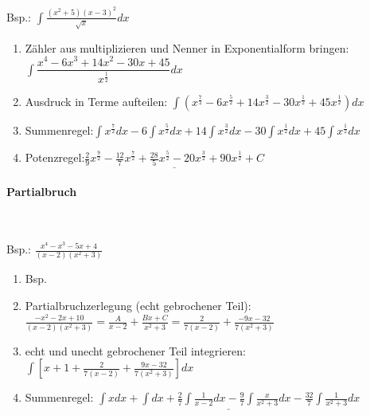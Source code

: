 				\begin{minipage}[c]{.2\textwidth}
					Bsp.: $\int \frac{\left(x^{2}+5\right)(x-3)^{2}}{\sqrt{x}} d x$
				\end{minipage}
				\begin{minipage}{.8\textwidth}
					\begin{enumerate}
						\item Zähler aus multiplizieren und Nenner in Exponentialform bringen:\quad
						$ \int \dfrac{x^{4}-6 x^{3}+14 x^{2}-30 x+45}{x^{\frac{1}{2}}} d x $
						\item Ausdruck in Terme aufteilen: \quad$ \int \left( x^{\frac{7}{2}}-6 x^{\frac{5}{2}}+14 x^{\frac{3}{2}}-30 x^{\frac{1}{2}}+45 x^{\frac{1}{2}} \right) d x $
						\item Summenregel:\quad $ \int x^{\frac{7}{2}} d x-6 \int x^{\frac{5}{2}} d x+14 \int x^{\frac{3}{2}} d x-30 \int x^{\frac{1}{2}} d x+45 \int x^{\frac{1}{2}} d x $
						\item Potenzregel:\quad $ \underline{ \frac{2}{9} x^{\frac{9}{2}}-\frac{12}{7} x^{\frac{7}{2}}+\frac{28}{5} x^{\frac{5}{2}}-20 x^{\frac{3}{2}}+90 x^{\frac{1}{2}}+C} $
					\end{enumerate}				
				\end{minipage}
		
		
			\paragraph{Partialbruch}\
			
				\begin{minipage}[c]{.2\textwidth}
					Bsp.: $ \frac{x^{4}-x^{3}-5 x+4}{(x-2)\left(x^{2}+3\right)} $
				\end{minipage}
				\begin{minipage}{.8\textwidth}
					\begin{enumerate}
						\item Bsp. 
						\item Partialbruchzerlegung (echt gebrochener Teil): $ \frac{-x^{2}-2 x+10}{(x-2)\left(x^{2}+3\right)}= \frac{A}{x-2}+\frac{B x+C}{x^{2}+3} = \frac{2}{7(x-2)}+\frac{-9 x-32}{7\left(x^{2}+3\right)}$
						\item echt und unecht gebrochener Teil integrieren: $ \int\left[x+1+\frac{2}{7(x-2)}+\frac{9 x-32}{7\left(x^{2}+3\right)}\right] d x $
						\item Summenregel: $ \underline{\int x dx+\int d x+\frac{2}{7} \int \frac{1}{x-2} d x-\frac{9}{7} \int \frac{x}{x^{2}+3} d x-\frac{32}{7} \int \frac{1}{x^{2}+3} dx} $
					\end{enumerate}				
				\end{minipage}